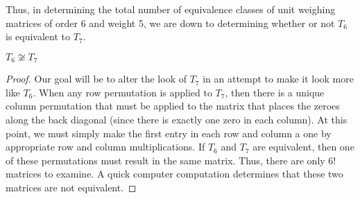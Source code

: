 Thus, in determining the total number of equivalence classes of unit weighing matrices of order 6 and weight 5, we are down to determining whether or not $T_6$ is equivalent to $T_7$.

\begin{lemma} \label{lem:t6-t7}
 $T_6 \not\cong T_7$

 \begin{proof}
  Our goal will be to alter the look of $T_7$ in an attempt to make it look more like $T_6$. When any row permutation is applied to $T_7$, then there is a unique column permutation that must be applied to the matrix that places the zeroes along the back diagonal (since there is exactly one zero in each column). At this point, we must simply make the first entry in each row and column a one by appropriate row and column multiplications. If $T_6$ and $T_7$ are equivalent, then one of these permutations must result in the same matrix. Thus, there are only $6!$ matrices to examine. A quick computer computation determines that these two matrices are not equivalent.
 \end{proof}

\end{lemma}

